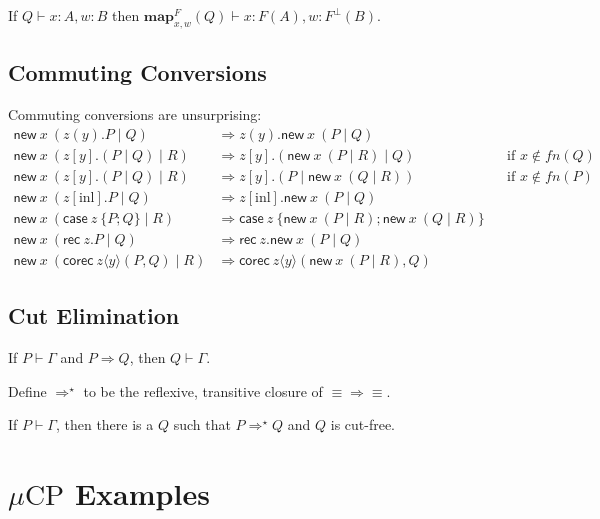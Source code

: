 \documentclass[orivec,envcountsame]{llncs}
\newcommand{\cpdual}[1]{#1^\perp}
\newcommand{\cptyp}[2]{#1 \vdash #2}
\newcommand{\expand}[3]{\mathbf{map}^{#1}_{#2}(#3)}
\newcommand{\mkwd}[1]{\mathsf{#1}}
\newcommand{\cut}[4]{\mkwd{new}\:#1 \: (#3 \mid #4)}
\newcommand{\rec}[1]{\mkwd{rec}\:#1}
\newcommand{\corec}[5]{\mkwd{corec}\:#1 \langle #2 \rangle (#4,#5)}
\newcommand{\clabel}[1]{\mathrm{#1}}
\renewcommand{\case}[2]{\mkwd{case}\:#1\:\{#2\}}
\newcommand{\sel}[2]{#1[\clabel{#2}]}
\newcommand{\mucp}{$\mu\mathrm{CP}$\xspace}
\begin{document}
\begin{lemma}
  If $\cptyp{Q}{x:A,w:B}$ then \(\cptyp{\expand{F}{x,w}{Q}}{x:F(A), w:\cpdual{F}(B)}.\)
\end{lemma}

\subsection{Commuting Conversions}

Commuting conversions are unsurprising:
{\small\begin{align*}
  \cut{x}{A}{z(y).P}{Q} &\Longrightarrow z(y).\cut{x}{A}{P}{Q} \\
  \cut{x}{A}{z[y].(P \mid Q)}{R} &\Longrightarrow z[y].(\cut{x}{A}{P}{R} \mid Q) &&\text{if $x \not\in fn(Q)$} \\
  \cut{x}{A}{z[y].(P \mid Q)}{R} &\Longrightarrow z[y].(P \mid \cut{x}{A}{Q}{R}) &&\text{if $x \not\in fn(P)$} \\
  \cut{x}{A}{\sel{z}{inl}.P}{Q} &\Longrightarrow \sel{z}{inl}.\cut{x}{A}{P}{Q} \\
  \cut{x}{A}{\case{z}{P;Q}}{R} &\Longrightarrow \case{z}{\cut{x}{A}{P}{R}; \cut{x}{A}{Q}{R}} \\
  \cut{x}{A}{\rec{z}.P}{Q} &\Longrightarrow \rec{z}.\cut{x}{A}{P}{Q} \\
  \cut{x}{A}{\corec{z}{y}{B}{P}{Q}}{R} &\Longrightarrow \corec{z}{y}{B}{\cut{x}{A}{P}{R}}{Q}
\end{align*}}

\subsection{Cut Elimination}

\begin{theorem}
  If $\cptyp{P}{\Gamma}$ and $P \Longrightarrow Q$, then $\cptyp{Q}{\Gamma}.$
\end{theorem}

Define $\Longrightarrow^\star$ to be the reflexive, transitive closure of $\equiv\Longrightarrow\equiv$.

\begin{theorem}
  If $\cptyp{P}{\Gamma}$, then there is a $Q$ such that $P \Longrightarrow^\star Q$ and $Q$ is cut-free.
\end{theorem}

\section{\mucp Examples}
\end{document}
